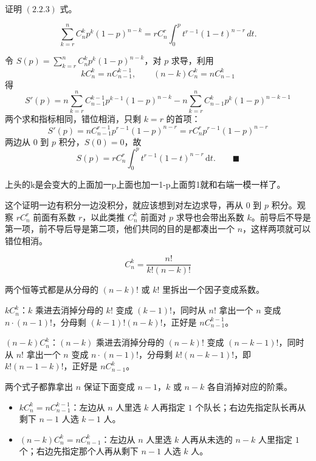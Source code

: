\begin{homework}[1]
证明 $(2.2.3)$ 式。

\[
\sum_{k=r}^{n} C_n^k p^k(1-p)^{n-k}
=
rC_n^r\int_0^p t^{r-1}(1-t)^{n-r}\,dt.
\]
\end{homework}
\begin{solution}
令 $S(p)=\displaystyle\sum_{k=r}^{n} C_n^k p^k(1-p)^{n-k}$，对 $p$ 求导，利用
$$kC_n^k = nC_{n-1}^{k-1}, \qquad (n-k)C_n^k = nC_{n-1}^k$$
得
$$S'(p) = n\sum_{k=r}^{n} C_{n-1}^{k-1} p^{k-1}(1-p)^{n-k} - n\sum_{k=r}^{n} C_{n-1}^k p^k(1-p)^{n-k-1}$$
两个求和指标相同，错位相消，只剩 $k=r$ 的首项：
$$S'(p) = nC_{n-1}^{r-1}p^{r-1}(1-p)^{n-r} = rC_n^r p^{r-1}(1-p)^{n-r}$$
两边从 $0$ 到 $p$ 积分，$S(0)=0$，故
$$S(p) = rC_n^r\int_0^p t^{r-1}(1-t)^{n-r}\,\mathrm{d}t. \qquad \blacksquare$$
\end{solution}
\begin{dxtips}
    上头的k是会变大的上面加一p上面也加一1-p上面剪1就和右端一模一样了。
\end{dxtips}
\begin{dxtips}
这个证明一边有积分一边没积分，就应该想到对左边求导，再从 $0$ 到 $p$ 积分。观察 $rC_n^r$ 前面有系数 $r$，以此类推 $C_n^k$ 前面对 $p$ 求导也会带出系数 $k$。前导后不导是第一项，前不导后导是第二项，他们共同的目的是都凑出一个 $n$，这样两项就可以错位相消。
\end{dxtips}
\begin{note}[组合恒等式的记忆]
$$C_n^k = \frac{n!}{k!(n-k)!}$$
\begin{dxtips}
两个恒等式都是从分母的 $(n-k)!$ 或 $k!$ 里拆出一个因子变成系数。

$kC_n^k$：$k$ 乘进去消掉分母的 $k!$ 变成 $(k-1)!$，同时从 $n!$ 拿出一个 $n$ 变成 $n\cdot(n-1)!$，分母剩 $(k-1)!(n-k)!$，正好是 $nC_{n-1}^{k-1}$。

$(n-k)C_n^k$：$(n-k)$ 乘进去消掉分母的 $(n-k)!$ 变成 $(n-k-1)!$，同时从 $n!$ 拿出一个 $n$ 变成 $n\cdot(n-1)!$，分母剩 $k!(n-k-1)!$，即 $k!(n-1-k)!$，正好是 $nC_{n-1}^{k}$。

两个式子都靠拿出 $n$ 保证下面变成 $n-1$，$k$ 或 $n-k$ 各自消掉对应的阶乘。
\end{dxtips}
\begin{itemize}
  \item $kC_n^k = nC_{n-1}^{k-1}$：左边从 $n$ 人里选 $k$ 人再指定 $1$ 个队长；右边先指定队长再从剩下 $n-1$ 人选 $k-1$ 人。
  \item $(n-k)C_n^k = nC_{n-1}^k$：左边从 $n$ 人里选 $k$ 人再从未选的 $n-k$ 人里指定 $1$ 个；右边先指定那个人再从剩下 $n-1$ 人选 $k$ 人。
\end{itemize}
\end{note}
